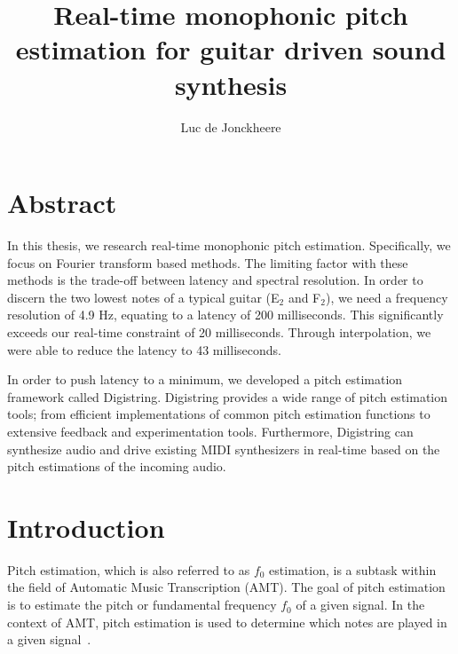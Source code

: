\documentclass[a4paper,10pt,twocolumn]{article}
\title{\textbf{Real-time monophonic pitch estimation for guitar driven sound synthesis}}
\author{Luc de Jonckheere}
\newcommand{\note}[2]{#1${}_{#2}$}
\begin{document}

\ifdefined\notitle
\else
    \maketitle
\fi


\section*{Abstract}
In this thesis, we research real-time monophonic pitch estimation. Specifically, we focus on Fourier transform based methods. The limiting factor with these methods is the trade-off between latency and spectral resolution. In order to discern the two lowest notes of a typical guitar (\note{E}{2} and \note{F}{2}), we need a frequency resolution of 4.9 Hz, equating to a latency of 200 milliseconds. This significantly exceeds our real-time constraint of 20 milliseconds. Through interpolation, we were able to reduce the latency to 43 milliseconds.

In order to push latency to a minimum, we developed a pitch estimation framework called Digistring. Digistring provides a wide range of pitch estimation tools; from efficient implementations of common pitch estimation functions to extensive feedback and experimentation tools. Furthermore, Digistring can synthesize audio and drive existing MIDI synthesizers in real-time based on the pitch estimations of the incoming audio.
\ifdefined\notitle
    \vfill
    \pagebreak
    \!
    \pagebreak
\fi

\ifdefined\notitle
    \onecolumn
\fi
\tableofcontents
\vfill
\ifdefined\notitle
    \pagebreak
    \twocolumn
\fi


\section{Introduction}
Pitch estimation, which is also referred to as $f_0$ estimation, is a subtask within the field of Automatic Music Transcription (AMT). The goal of pitch estimation is to estimate the pitch or fundamental frequency $f_0$ of a given signal. In the context of AMT, pitch estimation is used to determine which notes are played in a given signal~\cite{survey2}.
\end{document}
